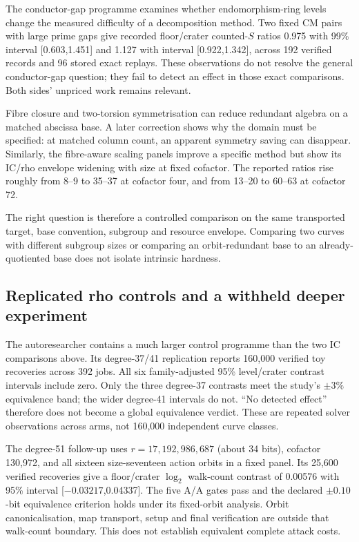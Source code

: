 The conductor-gap programme examines whether endomorphism-ring levels
change the measured difficulty of a decomposition method. Two fixed CM
pairs with large prime gaps give recorded floor/crater counted-$S$
ratios 0.975 with 99\% interval [0.603,1.451] and 1.127 with interval
[0.922,1.342], across 192 verified records and 96 stored exact replays.
These observations do not resolve the general conductor-gap question;
they fail to detect an effect in those exact comparisons. Both sides'
unpriced work remains relevant.

Fibre closure and two-torsion symmetrisation can reduce redundant algebra
on a matched abscissa base. A later correction shows why the domain
must be specified: at matched column count, an apparent symmetry saving
can disappear. Similarly, the fibre-aware scaling panels improve a
specific method but show its IC/rho envelope widening with size at
fixed cofactor. The reported ratios rise roughly from 8--9 to 35--37
at cofactor four, and from 13--20 to 60--63 at cofactor 72.

The right question is therefore a controlled comparison on the same
transported target, base convention, subgroup and resource envelope.
Comparing two curves with different subgroup sizes or comparing an
orbit-redundant base to an already-quotiented base does not isolate
intrinsic hardness.

\subsection{Replicated rho controls and a withheld deeper experiment}

The autoresearcher contains a much larger control programme than the two
IC comparisons above. Its degree-37/41 replication reports 160,000
verified toy recoveries across 392 jobs. All six family-adjusted 95\%
level/crater contrast intervals include zero. Only the three degree-37
contrasts meet the study's $\pm3\%$ equivalence band; the wider degree-41
intervals do not. ``No detected effect'' therefore does not become a
global equivalence verdict. These are repeated solver observations across
arms, not 160,000 independent curve classes.

The degree-51 follow-up uses $r=17,192,986,687$ (about 34 bits), cofactor
130,972, and all sixteen size-seventeen action orbits in a fixed panel.
Its 25,600 verified recoveries give a floor/crater $\log_2$ walk-count
contrast of 0.00576 with 95\% interval [$-0.03217$,0.04337]. The five
A/A gates pass and the declared $\pm0.10$-bit equivalence criterion holds
under its fixed-orbit analysis. Orbit canonicalisation, map transport,
setup and final verification are outside that walk-count boundary.
This does not establish equivalent complete attack costs.

